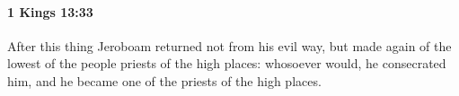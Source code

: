 
		\paragraph{1 Kings 13:33} %
			\label{1KINGS-13-33}

			After this thing Jeroboam returned not from his evil way, but made again of the lowest of the people priests of the high places: whosoever would, he consecrated him, and he became one of the priests of the high places.


